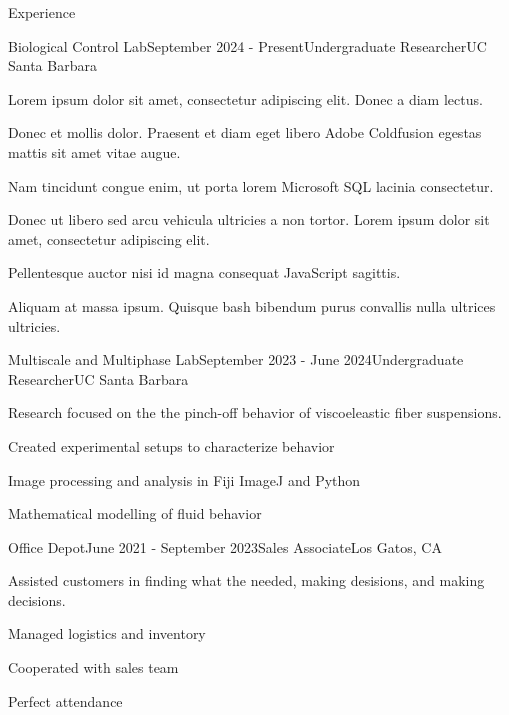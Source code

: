 \documentclass[
	11pt, %
]{resume} %
\begin{document}
\begin{rSection}{Experience}

	\begin{rSubsection}{Biological Control Lab}{September 2024 - Present}{Undergraduate Researcher}{UC Santa Barbara}
		\item Lorem ipsum dolor sit amet, consectetur adipiscing elit. Donec a diam lectus.
		\item Donec et mollis dolor. Praesent et diam eget libero Adobe Coldfusion egestas mattis sit amet vitae augue.
		\item Nam tincidunt congue enim, ut porta lorem Microsoft SQL lacinia consectetur.
		\item Donec ut libero sed arcu vehicula ultricies a non tortor. Lorem ipsum dolor sit amet, consectetur adipiscing elit.
		\item Pellentesque auctor nisi id magna consequat JavaScript sagittis.
		\item Aliquam at massa ipsum. Quisque bash bibendum purus convallis nulla ultrices ultricies.
	\end{rSubsection}


	\begin{rSubsection}{Multiscale and Multiphase Lab}{September 2023 - June 2024}{Undergraduate Researcher}{UC Santa Barbara}
		\item Research focused on the the pinch-off behavior of viscoeleastic fiber suspensions.
		\item Created experimental setups to characterize behavior
		\item Image processing and analysis in Fiji ImageJ and Python
		\item Mathematical modelling of fluid behavior
	\end{rSubsection}


	\begin{rSubsection}{Office Depot}{June 2021 - September 2023}{Sales Associate}{Los Gatos, CA}
		\item Assisted customers in finding what the needed, making desisions, and making decisions.
		\item Managed logistics and inventory
		\item Cooperated with sales team
		\item Perfect attendance
	\end{rSubsection}

\end{rSection}
\end{document}
